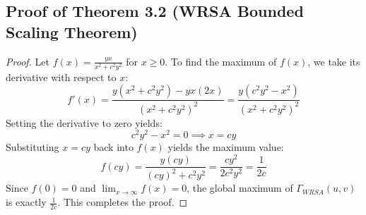 \documentclass{article}
\theoremstyle{plain}
\theoremstyle{definition}
\theoremstyle{remark}
\begin{document}
\subsection{Proof of Theorem 3.2 (WRSA Bounded Scaling Theorem)}
\label{app:proof_bounded_scaling}
\begin{proof}
  Let $f(x) = \frac{y x}{x^2 + c^2 y^2}$ for $x \ge 0$. To find the maximum of $f(x)$, we take its derivative with respect to $x$:
  \begin{equation}
    f'(x) = \frac{y(x^2 + c^2 y^2) - y x (2x)}{(x^2 + c^2 y^2)^2} = \frac{y (c^2 y^2 - x^2)}{(x^2 + c^2 y^2)^2}
  \end{equation}
  Setting the derivative to zero yields:
  \begin{equation}
    c^2 y^2 - x^2 = 0 \implies x = c y
  \end{equation}
  Substituting $x = c y$ back into $f(x)$ yields the maximum value:
  \begin{equation}
    f(c y) = \frac{y (c y)}{(c y)^2 + c^2 y^2} = \frac{c y^2}{2 c^2 y^2} = \frac{1}{2c}
  \end{equation}
  Since $f(0) = 0$ and $\lim_{x\to\infty} f(x) = 0$, the global maximum of $\Gamma_{WRSA}(u, v)$ is exactly $\frac{1}{2c}$. This completes the proof.
\end{proof}
\end{document}

